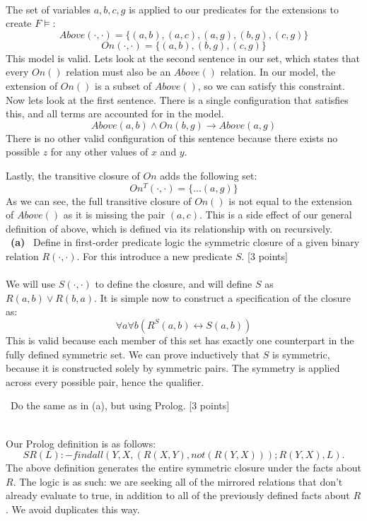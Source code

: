 \documentclass[12pt,fullpage]{article}
\begin{document}
\vspace{2mm} \\
The set of variables ${a,b,c,g}$ is applied to our predicates for the extensions to create $F \models $:
$$ Above(\cdot, \cdot) = \{(a,b), (a,c), (a,g), (b,g), (c,g)\} $$
$$ On(\cdot, \cdot) = \{(a,b), (b,g), (c,g)\} $$
This model is valid. Lets look at the second sentence in our set, which states that every $On()$ relation must also be an $Above()$ relation. In our model, the extension of $On()$ is a subset of $Above()$, so we can satisfy this constraint.
Now lets look at the first sentence. There is a single configuration that satisfies this, and all terms are accounted for in the model.
$$Above(a, b) \wedge On(b, g) \rightarrow Above(a,g)$$
There is no other valid configuration of this sentence because there exists no possible $z$ for any other values of $x$ and $y$.

\vspace{2mm} \noindent Lastly, the transitive closure of $On$ adds the following set:
$$ On^T(\cdot, \cdot) = \{...(a,g)\} $$
As we can see, the full transitive closure of $On()$ is not equal to the extension of $Above()$ as it is missing the pair $(a,c)$. This is a side effect of our general definition of above, which is defined via its relationship with on recursively.\\

 \ {\bf (a)} \ Define in first-order predicate logic the symmetric closure of a given binary relation $R(\cdot, \cdot)$. For this introduce a new predicate $S$. \hfill [3 points]\\

\vspace{2mm} \\
We will use $S(\cdot,\cdot)$ to define the closure, and will define $S$ as $R(a,b) \vee R(b,a)$. It is simple now to construct a specification of the closure as:
$$\forall a \forall b (R^S(a,b) \leftrightarrow S(a,b))$$
This is valid because each member of this set has exactly one counterpart in the fully defined symmetric set. We can prove inductively that $S$ is symmetric, because it is constructed solely by symmetric pairs. The symmetry is applied across every possible pair, hence the qualifier.

\vspace{2mm}  \ Do the same as in (a), but using Prolog. \hfill [3 points]

\vspace{2mm} \\
Our Prolog definition is as follows:
$$SR(L) :- findall({Y,X}, (R(X,Y), not(R(Y,X)));R(Y,X), L).$$
The above definition generates the entire symmetric closure under the facts about $R$. The logic is as such: we are seeking all of the mirrored relations that don't already evaluate to true, in addition to all of the previously defined facts about $R$. We avoid duplicates this way.\\
\end{document}
